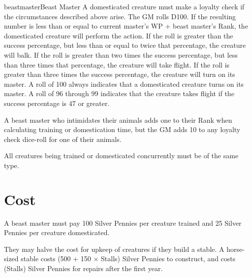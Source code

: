 \begin{Skill}[1.1]{beastmaster}{Beast Master}
A domesticated creature must make a loyalty check if the circumstances
described above arise.  The GM rolls D100. If the resulting number is
less than or equal to current master’s WP + beast master’s Rank, the
domesticated creature will perform the action.  If the roll is greater
than the success percentage, but less than or equal to twice that
percentage, the creature will balk. If the roll is greater than two
times the success percentage, but less than three times that
percentage, the creature will take flight. If the roll is greater than
three times the success percentage, the creature will turn on its
master.  A roll of 100 always indicates that a domesticated creature
turns on its master. A roll of 96 through 99 indicates that the
creature takes flight if the success percentage is 47 or greater.

A beast master who intimidates their animals adds one to their Rank
when calculating training or domestication time, but the GM adds 10 to
any loyalty check dice-roll for one of their animals.


All creatures being trained or domesticated concurrently must be of
the same type.

\section{Cost}

A beast master must pay 100 Silver Pennies per creature trained and 25
Silver Pennies per creature domesticated.

They may halve the cost for upkeep of creatures if they build a
stable.  A horse-sized stable costs (500 + 150 × Stalls) Silver
Pennies to construct, and costs (Stalls) Silver Pennies for repairs
after the first year.

\end{Skill}


